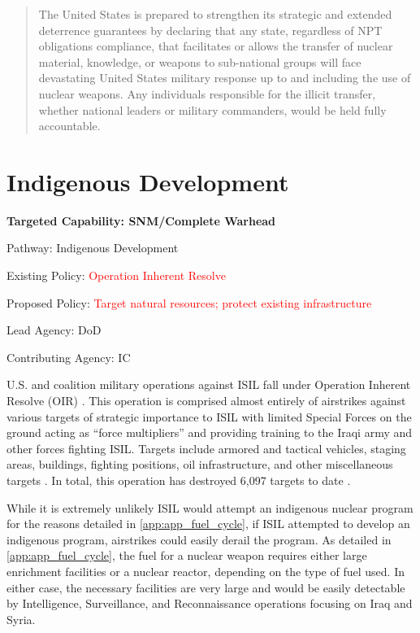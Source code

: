 \documentclass{report}
\begin{document}
\blockquote{The United States is prepared to strengthen its strategic and extended deterrence guarantees by declaring that any state, regardless of NPT obligations compliance, that facilitates or allows the transfer of nuclear material, knowledge, or weapons to sub-national groups will face devastating United States military response up to and including the use of nuclear weapons.  Any individuals responsible for the illicit transfer, whether national leaders or military commanders, would be held fully accountable.}








\section{Indigenous Development}




\bfseries Targeted Capability: SNM/Complete Warhead 

Pathway: Indigenous Development

Existing Policy: \textcolor{red}{Operation Inherent Resolve}

Proposed Policy: \textcolor{red}{Target natural resources; protect existing infrastructure}

Lead Agency: DoD

Contributing Agency: IC \normalfont


U.S. and coalition military operations against ISIL fall under Operation Inherent Resolve (OIR) \cite{GlobalSecurity2015}. This operation is comprised almost entirely of airstrikes against various targets of strategic importance to ISIL with limited Special Forces on the ground acting as \enquote{force multipliers} and providing training to the Iraqi army and other forces fighting ISIL. Targets include armored and tactical vehicles, staging areas, buildings, fighting positions, oil infrastructure, and other miscellaneous targets \cite{U.S.DepartmentofDefense2014}. In total, this operation has destroyed 6,097 targets to date \cite{U.S.DepartmentofDefense2014}.

While it is extremely unlikely ISIL would attempt an indigenous nuclear program for the reasons detailed in \autoref{app:app_fuel_cycle}, if ISIL attempted to develop an indigenous program, airstrikes could easily derail the program. As detailed in \autoref{app:app_fuel_cycle}, the fuel for a nuclear weapon requires either large enrichment facilities or a nuclear reactor, depending on the type of fuel used. In either case, the necessary facilities are very large and would be easily detectable by Intelligence, Surveillance, and Reconnaissance operations focusing on Iraq and Syria. 
\end{document}
